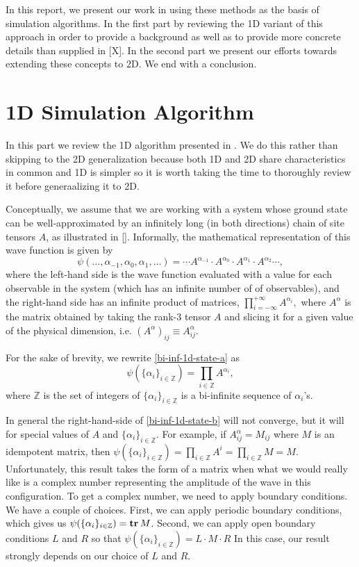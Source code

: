 \documentclass{article}
\newcommand{\tr}{\text{\textbf{tr}}\,}
\newcommand{\Z}{\mathbb{Z}}
\begin{document}
In this report, we present our work in using these methods as the basis of simulation algorithms.  In the first part by reviewing the 1D variant of this approach in order to provide a background as well as to provide more concrete details than supplied in [X].  In the second part we present our efforts towards extending these concepts to 2D.  We end with a conclusion.

\part{1D Simulation Algorithm}
\label{1dsim}

In this part we review the 1D algorithm presented in \cite{Crosswhite2008}.  We do this rather than skipping to the 2D generalization because both 1D and 2D share characteristics in common and 1D is simpler so it is worth taking the time to thoroughly review it before generaalizing it to 2D.

Conceptually, we assume that we are working with a system whose ground state can be well-approximated by an infinitely long (in both directions) chain of site tensors $A$, as illustrated in [].  Informally, the mathematical representation of this wave function is given by
\begin{equation}
\label{bi-inf-1d-state-a}
\psi(\dots,\alpha_{-1},\alpha_{0},\alpha_1,\dots)= \cdots A^{\alpha_{-1}} \cdot A^{\alpha_0}\cdot A^{\alpha_1}\cdot A^{\alpha_2} \cdots,
\end{equation}
where the left-hand side is the wave function evaluated with a value for each observable in the system (which has an infinite number of of observables), and the right-hand side has an infinite product of matrices, $\prod_{i=-\infty}^{+\infty} A^{\alpha_i},$ where $A^{\alpha}$ is the matrix obtained by taking the rank-3 tensor $A$ and slicing it for a given value of the physical dimension, i.e. $(A^\alpha)_{ij}\equiv A^\alpha_{ij}$.

For the sake of brevity, we rewrite \ref{bi-inf-1d-state-a} as
\begin{equation}
\label{bi-inf-1d-state-b}
\psi(\{\alpha_i\}_{i\in\Z}) = \prod_{i\in\Z} A^{\alpha_i},
\end{equation}
where $\Z$ is the set of integers of $\{\alpha_i\}_{i\in\Z}$ is a bi-infinite sequence of $\alpha_i$'s.

In general the right-hand-side of \ref{bi-inf-1d-state-b} will not converge, but it will for special values of $A$ and $\{\alpha_i\}_{i\in\Z}$.  For example, if $A^\alpha_{ij}=M_{ij}$ where $M$ is an idempotent matrix, then $\psi(\{\alpha_i\}_{i\in\Z})=\prod_{i\in\Z} A^i = \prod_{i\in\Z} M = M$.  Unfortunately, this result takes the form of a matrix when what we would really like is a complex number representing the amplitude of the wave in this configuration.  To get a complex number, we need to apply boundary conditions.  We have a couple of choices.  First, we can apply periodic boundary conditions, which gives us $\psi(\{\alpha_i\}_{i\in\Z})=\tr M$.  Second, we can apply open boundary conditions $L$ and $R$ so that $\psi(\{\alpha_i\}_{i\in\Z})=L\cdot M\cdot R$  In this case, our result strongly depends on our choice of $L$ and $R$.
\end{document}
